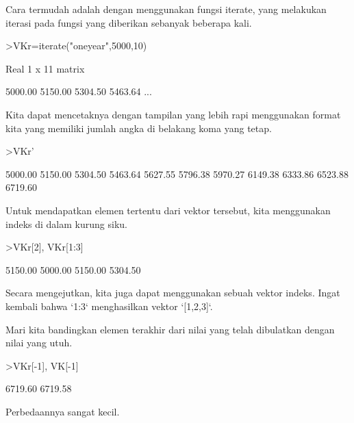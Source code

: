 \documentclass{article}
\newenvironment{eulernotebook}{\par}{\par}
\newenvironment{eulercomment}{\par\medskip}{\par\medskip}
\begin{document}
\begin{eulernotebook}
\begin{eulercomment}
\begin{eulercomment}
\begin{eulercomment}
\begin{eulercomment}
\begin{eulercomment}
\begin{eulercomment}
\begin{eulercomment}
\begin{eulercomment}
\begin{eulercomment}
Cara termudah adalah dengan menggunakan fungsi iterate, yang melakukan
iterasi pada fungsi yang diberikan sebanyak beberapa kali.
\end{eulercomment}
\begin{eulerprompt}
>VKr=iterate("oneyear",5000,10)
\end{eulerprompt}
\begin{euleroutput}
  Real 1 x 11 matrix
  
      5000.00     5150.00     5304.50     5463.64     ...
\end{euleroutput}
\begin{eulercomment}
Kita dapat mencetaknya dengan tampilan yang lebih rapi menggunakan
format kita yang memiliki jumlah angka di belakang koma yang tetap.
\end{eulercomment}
\begin{eulerprompt}
>VKr'
\end{eulerprompt}
\begin{euleroutput}
      5000.00 
      5150.00 
      5304.50 
      5463.64 
      5627.55 
      5796.38 
      5970.27 
      6149.38 
      6333.86 
      6523.88 
      6719.60 
\end{euleroutput}
\begin{eulercomment}
Untuk mendapatkan elemen tertentu dari vektor tersebut, kita
menggunakan indeks di dalam kurung siku.
\end{eulercomment}
\begin{eulerprompt}
>VKr[2], VKr[1:3]
\end{eulerprompt}
\begin{euleroutput}
      5150.00 
      5000.00     5150.00     5304.50 
\end{euleroutput}
\begin{eulercomment}
Secara mengejutkan, kita juga dapat menggunakan sebuah vektor indeks.
Ingat kembali bahwa `1:3` menghasilkan vektor `[1,2,3]`.

Mari kita bandingkan elemen terakhir dari nilai yang telah dibulatkan
dengan nilai yang utuh.
\end{eulercomment}
\begin{eulerprompt}
>VKr[-1], VK[-1]
\end{eulerprompt}
\begin{euleroutput}
      6719.60 
      6719.58 
\end{euleroutput}
\begin{eulercomment}
Perbedaannya sangat kecil.


\end{eulercomment}
\end{eulercomment}
\end{eulercomment}
\end{eulercomment}
\end{eulercomment}
\end{eulercomment}
\end{eulercomment}
\end{eulercomment}
\end{eulercomment}
\end{eulernotebook}
\end{document}
